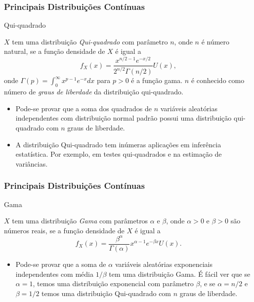\begin{frame}
\frametitle{\textbf{Principais Distribuições Contínuas}}
\baselineskip=13pt
\begin{block}{Qui-quadrado}

$X$ tem uma distribuição {\em
Qui-quadrado} com parâmetro $n$, onde $n$ é número
natural, se a função densidade de $X$ é igual a
%
$$ f_X(x)= \frac{x^{n/2-1}e^{-x/2}}{2^{n/2}\Gamma(n/2)}U(x),$$
onde $\Gamma(p)=\int_{0}^{\infty}x^{p-1}e^{-x}dx$ para $p>0$ é a função gama. $n$ é conhecido como número de {\em graus de liberdade} da distribuição qui-quadrado.

\begin{itemize}
\item Pode-se provar que a soma dos quadrados de $n$ variáveis aleatórias independentes com distribuição normal padrão possui uma distribuição qui-quadrado com $n$ graus de liberdade.

\item A distribuição Qui-quadrado tem inúmeras aplicações em inferência estatística. Por exemplo, em testes qui-quadrados e na estimação de variâncias.
\end{itemize}

\end{block}
\end{frame}

\begin{frame}
\frametitle{\textbf{Principais Distribuições Contínuas}}
\baselineskip=13pt
\begin{block}{Gama}


$X$ tem uma distribuição {\em
Gama} com parâmetros $\alpha$ e $\beta$, onde $\alpha>0$ e $\beta>0$ são números
reais, se a função densidade de $X$ é igual a
%
$$ f_X(x)= \frac{\beta^\alpha}{\Gamma(\alpha)}x^{\alpha-1}e^{-\beta x}U(x).$$

\begin{itemize}
\item Pode-se provar que a soma de $\alpha$ variáveis aleatórias exponenciais independentes com média $1/\beta$ tem uma distribuição Gama. É fácil ver que se $\alpha=1$, temos uma distribuição exponencial com parâmetro $\beta$, e se $\alpha=n/2$ e $\beta=1/2$ temos uma distribuição Qui-quadrado com $n$ graus de liberdade.
\end{itemize}

\end{block}
\end{frame}

